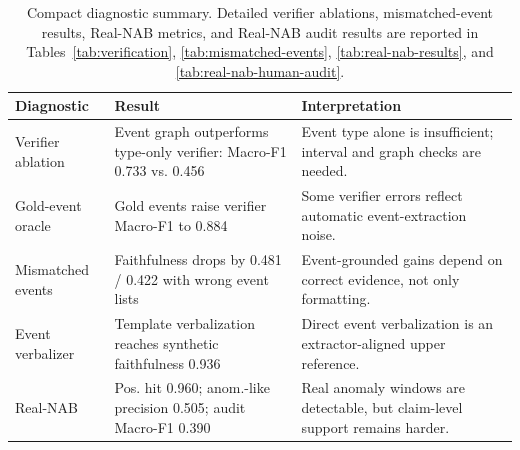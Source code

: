 \begin{table}[!tbp]
\centering
\small
\setlength{\tabcolsep}{5pt}
\begin{tabular}{@{}p{}p{}p{}@{}}
\toprule
Diagnostic & Result & Interpretation \\
\midrule
Verifier ablation
& Event graph outperforms type-only verifier: Macro-F1 0.733 vs. 0.456
& Event type alone is insufficient; interval and graph checks are needed. \\

Gold-event oracle
& Gold events raise verifier Macro-F1 to 0.884
& Some verifier errors reflect automatic event-extraction noise. \\

Mismatched events
& Faithfulness drops by 0.481 / 0.422 with wrong event lists
& Event-grounded gains depend on correct evidence, not only formatting. \\

Event verbalizer
& Template verbalization reaches synthetic faithfulness 0.936
& Direct event verbalization is an extractor-aligned upper reference. \\

Real-NAB
& Pos. hit 0.960; anom.-like precision 0.505; audit Macro-F1 0.390
& Real anomaly windows are detectable, but claim-level support remains harder. \\
\bottomrule
\end{tabular}
\caption{Compact diagnostic summary. Detailed verifier ablations, mismatched-event results, Real-NAB metrics, and Real-NAB audit results are reported in Tables~\ref{tab:verification}, \ref{tab:mismatched-events}, \ref{tab:real-nab-results}, and \ref{tab:real-nab-human-audit}.}
\label{tab:key-diagnostics}
\end{table}